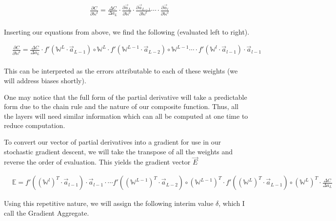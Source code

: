 \documentclass[8pt]{amsart}
\newcommand\mat[1]{\mathbb{#1}}
\begin{document}
\[
    \begin{aligned}
        & \frac{ \partial C }{ \partial \mat{W}^l } = \frac{ \Delta C }{ \Delta a_L }
            \cdot \frac{ \partial \vec{a}_L }{ \partial \mat{W}^l }
            \cdot \frac{ \partial \vec{a}_{L - 1} }{ \partial \mat{W}^l }
            \cdots
            \cdot \frac{ \partial \vec{a}_l }{ \partial \mat{W}^l } \\
    \end{aligned}
\]

Inserting our equations from above, we
find the following (evaluated left to right).

\[
    \begin{aligned}
        & \frac{ \partial C }{ \partial \mat{W}^l } = \frac{ \Delta C }{ \Delta a_L }
            \cdot
                f'(\mat{W}^L \cdot \vec{a}_{L - 1}) \circ \mat{W}^L
            \cdot
                f'(\mat{W}^{L - 1} \cdot \vec{a}_{L - 2}) \circ \mat{W}^{L - 1}
            \cdots
            \cdot
                f'(\mat{W}^l \cdot \vec{a}_{l - 1}) \cdot \vec{a}_{l - 1} \\
    \end{aligned}
\]

This can be interpreted as the errors attributable to each of these weights (we will
address biases shortly).

One may notice that the full form of the partial derivative will take a
predictable form due to the chain rule and the nature of our composite function.
Thus, all the layers will need similar information which can all be computed
at one time to reduce computation.

To convert our vector of partial derivatives into a gradient for use in our stochastic
gradient descent, we will take the transpose of all the weights and reverse the order
of evaluation. This yields the gradient vector $\vec{E}$

\[
    \begin{aligned}
        & \mat{E} = f'( (\mat{W}^l)^T \cdot \vec{a}_{l - 1}) \cdot \vec{a}_{l - 1}
            \cdot
            \cdots
                f'( (\mat{W}^{L - 1})^T \cdot \vec{a}_{L - 2} ) \circ (\mat{W}^{L - 1})^T
            \cdot
                f'( (\mat{W}^L)^T \cdot \vec{a}_{L - 1} ) \circ (\mat{W}^L)^T
            \cdot
                \frac{ \Delta C }{ \Delta a_L }
    \end{aligned}
\]

Using this repetitive nature, we will assign the following interim value $\delta$,
which I call the Gradient Aggregate.
\end{document}
